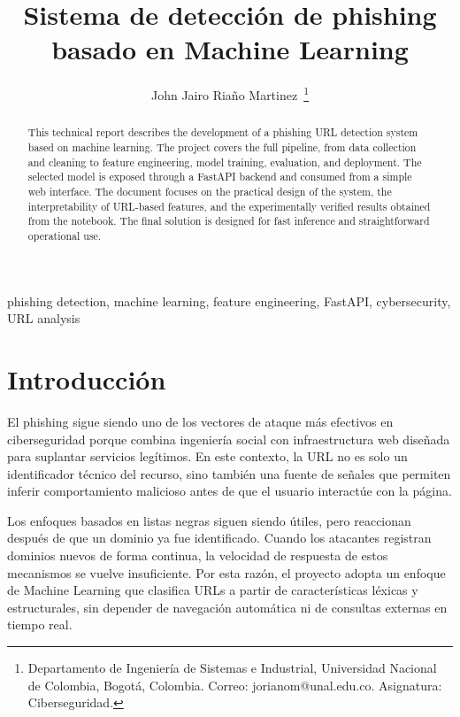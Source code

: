 \documentclass[conference]{IEEEtran}
\begin{document}
\title{Sistema de detección de phishing basado en Machine Learning}

\author{John Jairo Riaño Martinez\
\thanks{Departamento de Ingeniería de Sistemas e Industrial, Universidad Nacional de Colombia, Bogotá, Colombia. Correo: jorianom@unal.edu.co. Asignatura: Ciberseguridad.}}

\maketitle

\begin{abstract}
This technical report describes the development of a phishing URL detection system based on machine learning. The project covers the full pipeline, from data collection and cleaning to feature engineering, model training, evaluation, and deployment. The selected model is exposed through a FastAPI backend and consumed from a simple web interface. The document focuses on the practical design of the system, the interpretability of URL-based features, and the experimentally verified results obtained from the notebook. The final solution is designed for fast inference and straightforward operational use.
\end{abstract}

\begin{IEEEkeywords}
phishing detection, machine learning, feature engineering, FastAPI, cybersecurity, URL analysis
\end{IEEEkeywords}

\section{Introducción}
El phishing sigue siendo uno de los vectores de ataque más efectivos en ciberseguridad porque combina ingeniería social con infraestructura web diseñada para suplantar servicios legítimos. En este contexto, la URL no es solo un identificador técnico del recurso, sino también una fuente de señales que permiten inferir comportamiento malicioso antes de que el usuario interactúe con la página.

Los enfoques basados en listas negras siguen siendo útiles, pero reaccionan después de que un dominio ya fue identificado. Cuando los atacantes registran dominios nuevos de forma continua, la velocidad de respuesta de estos mecanismos se vuelve insuficiente. Por esta razón, el proyecto adopta un enfoque de Machine Learning que clasifica URLs a partir de características léxicas y estructurales, sin depender de navegación automática ni de consultas externas en tiempo real.
\end{document}
